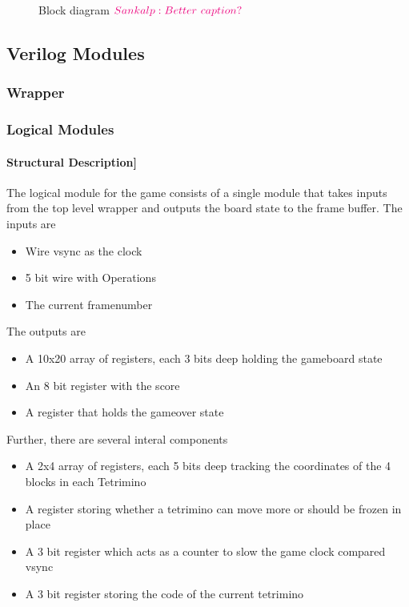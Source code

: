 
\begin{figure}[h]
    \centering
    
    \caption{Block diagram $\sankalp{Better\ caption?}$}
\label{fig:blockdiag}
\end{figure}

\subsection{Verilog Modules}

\subsubsection{Wrapper}


\subsubsection{Logical Modules}
\label{subsection:logicalmod}
\paragraph{Structural Description]}
\label{paragraph:Structuraldescr}
The logical module for the game consists of a single module that takes inputs from the top level wrapper and outputs the board state to the frame buffer. \newline
The inputs are 
\begin{itemize}
    \item Wire vsync as the clock 
    \item 5 bit wire with Operations
    \item The current framenumber 
\end{itemize}

The outputs are 
\begin{itemize}
    \item A 10x20 array of registers, each 3 bits deep holding the gameboard state
    \item An 8 bit register with the score
    \item A register that holds the gameover state 
\end{itemize}

Further, there are several interal components 
\begin{itemize}
    \item A 2x4 array of registers, each 5 bits deep tracking the coordinates of the 4 blocks in each Tetrimino
    \item A register storing whether a tetrimino can move more or should be frozen in place
    \item A 3 bit register which acts as a counter to slow the game clock compared vsync 
    \item A 3 bit register storing the code of the current tetrimino
\end{itemize}

